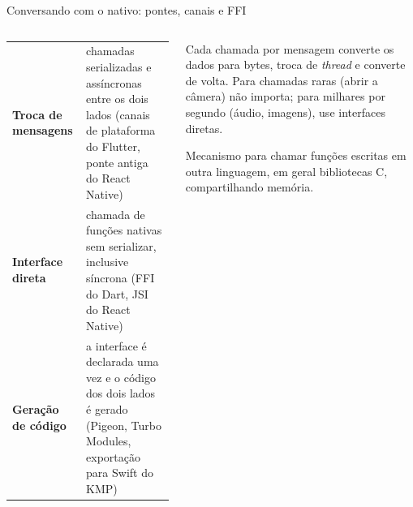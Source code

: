 \begin{frame}{Conversando com o nativo: pontes, canais e FFI}
  \begin{columns}[T]
    \begin{column}{0.5\textwidth}
      \scriptsize
      \begin{tabularx}{\linewidth}{@{}p{2.2cm} L@{}}
        \toprule
         &  \\
        \midrule
        \textbf{Troca de mensagens} & chamadas serializadas e assíncronas entre os dois lados (canais de plataforma do Flutter, ponte antiga do React Native) \\
        \textbf{Interface direta} & chamada de funções nativas sem serializar, inclusive síncrona (FFI do Dart, JSI do React Native) \\
        \textbf{Geração de código} & a interface é declarada uma vez e o código dos dois lados é gerado (Pigeon, Turbo Modules, exportação para Swift do KMP) \\
        \bottomrule
      \end{tabularx}
    \end{column}
    \begin{column}{0.48\textwidth}
      \begin{pordentro}
        Cada chamada por mensagem converte os dados para bytes, troca de \emph{thread} e converte de volta. Para chamadas raras (abrir a câmera) não importa; para milhares por segundo (áudio, imagens), use interfaces diretas.
      \end{pordentro}
      \begin{definicao}
        Mecanismo para chamar funções escritas em outra linguagem, em geral bibliotecas C, compartilhando memória.
      \end{definicao}
    \end{column}
  \end{columns}
\end{frame}

